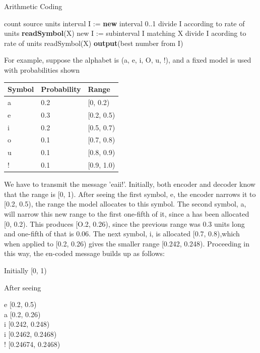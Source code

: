\documentclass{article}
\begin{document}
\begin{algorithm}
	\caption{Arithmetic Coding}
	\begin{algorithmic}[0]
		\STATE count source units
		\STATE interval I := \textbf{new} interval 0..1
		\STATE divide I according to rate of units
		\STATE \textbf{readSymbol}(X) \linebreak
		\STATE new I := subinterval I matching X
		\STATE divide I acording to rate of units
		\STATE readSymbol(X)
		\ENDWHILE
		\STATE \textbf{output}(best number from I)
	\end{algorithmic}
\end{algorithm}

For example, suppose the alphabet is (a, e, i, O, u, !), and a fixed model is used
with probabilities shown

\begin{table}[]
	\setlength{\extrarowheight}{0.2cm}
	\begin{tabular}{|l|l|l|}
		\hline
		Symbol & Probability & Range        \\ \hline
		a      & 0.2         & {[}0, 0.2)   \\ \hline
		e      & 0.3         & {[}0.2, 0.5) \\ \hline
		i      & 0.2         & {[}0.5, 0.7) \\ \hline
		o      & 0.1         & {[}0.7, 0.8) \\ \hline
		u      & 0.1         & {[}0.8, 0.9) \\ \hline
		!      & 0.1         & {[}0.9, 1.0) \\ \hline
	\end{tabular}
\end{table}

We have to transmit the message 'eaii!'. Initially, both encoder and decoder know that the range is [0, 1). After seeing the first symbol, e, the encoder narrows it to [0.2, 0.5), the range the model allocates to this symbol. The second symbol, a, will narrow this new range to the first one-fifth of it, since a has been allocated [0, 0.2). This produces [O.2, 0.26), since the previous range was 0.3 units long and one-fifth of that is 0.06. The next symbol, i, is allocated [0.7, 0.8),which when applied to [0.2, 0.26) gives the smaller range [0.242, 0.248). Proceeding in this way, the en-coded message builds up as follows:  

Initially [0, 1)

After seeing 

e [0.2, 0.5)
\\
a [0.2, 0.26)
\\
i [0.242, 0.248)
\\
i [0.2462, 0.2468)
\\
! [0.24674, 0.2468) \\
\end{document}
